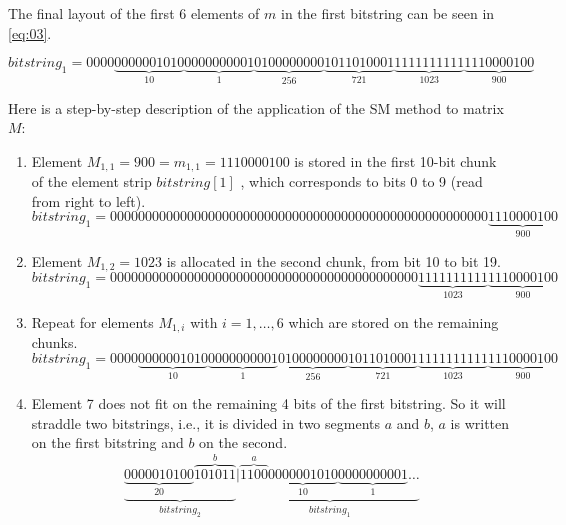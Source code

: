 \documentclass[10pt]{article}
\begin{document}
The final layout of the first 6 elements of $m$ in the first bitstring can be seen in \ref{eq:03}.

\begin{equation}\label{eq:03}
 bitstring_1 = 0000\underbrace{0000001010}_{10}\underbrace{0000000001}_{1}\underbrace{0100000000}_{256}\underbrace{1011010001}_{721}\underbrace{1111111111}_{1023}\underbrace{1110000100}_{900} 
\end{equation}

Here is a step-by-step description of the application of the SM method to matrix $M$:

\begin{enumerate}
 \item Element $M_{1,1}=900 = m_{1,1} = 1110000100$ is stored in the first 10-bit chunk of the element strip $bitstring[1]$ , which corresponds to bits 0 to 9 (read from right to left).
\begin{equation*}\label{eq:04}
bitstring_1 = 000000000000000000000000000000000000000000000000000000\underbrace{1110000100}_{900} 
\end{equation*}
 \item Element $M_{1,2}=1023$ is allocated in the second chunk, from bit 10 to bit 19.
\begin{equation*}\label{eq:05}
 bitstring_1 = 00000000000000000000000000000000000000000000\underbrace{1111111111}_{1023}\underbrace{1110000100}_{900} 
\end{equation*}
 \item Repeat for elements $M_{1,i}$ with $i=1,\ldots,6$ which are stored on the remaining chunks.
 \begin{equation*}\label{eq:06}
bitstring_1 = 0000\underbrace{0000001010}_{10}\underbrace{0000000001}_{1}\underbrace{0100000000}_{256}\underbrace{1011010001}_{721}\underbrace{1111111111}_{1023}\underbrace{1110000100}_{900} 
 \end{equation*}
 \item Element 7 does not fit on the remaining 4 bits of the first bitstring. So it will straddle two bitstrings, i.e., it is divided in two segments $a$ and $b$, $a$ is written on the first bitstring and $b$ on the second.
 \begin{equation*}\label{eq:07}
  \underbrace{\underbrace{0000010100}_{20}\overbrace{101011}^{b}}_{bitstring_2}|\underbrace{\overbrace{1100}^{a}\underbrace{0000001010}_{10}\underbrace{0000000001}_{1}\hdots}_{bitstring_1}
\end{equation*}
\end{enumerate}
\end{document}
